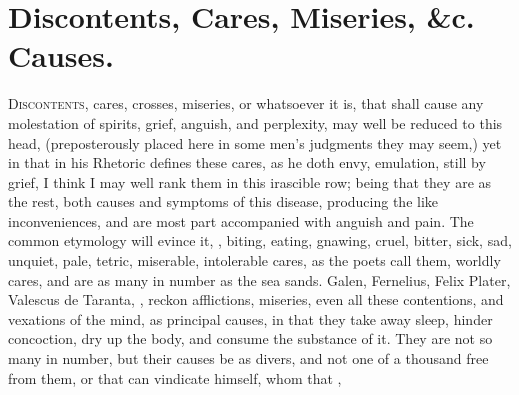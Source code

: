 \section{Discontents, Cares, Miseries, \&c. Causes.}

\lettrine{D}{iscontents}, cares, crosses, miseries, or whatsoever it is, that
shall cause any molestation of spirits, grief, anguish, and perplexity, may
well be reduced to this head, (preposterously placed here in some men's
judgments they may seem,) yet in that \Aristotle{} in his
Rhetoric defines these cares, as he doth envy, emulation,
\etc{} still by grief, I think I may well rank them in this irascible row;
being that they are as the rest, both causes and symptoms of this disease,
producing the like inconveniences, and are most part accompanied with anguish
and pain. The common etymology will evince it, , \etc{}
biting, eating, gnawing, cruel, bitter, sick, sad, unquiet, pale, tetric,
miserable, intolerable cares, as the poets call them,
worldly cares, and are as many in number as the sea sands.
Galen, Fernelius, Felix Plater, Valescus de Taranta,
\etc{}, reckon afflictions, miseries, even all these contentions, and vexations
of the mind, as principal causes, in that they take away sleep, hinder
concoction, dry up the body, and consume the substance of it. They are not so
many in number, but their causes be as divers, and not one of a thousand free
from them, or that can vindicate himself, whom that ,


